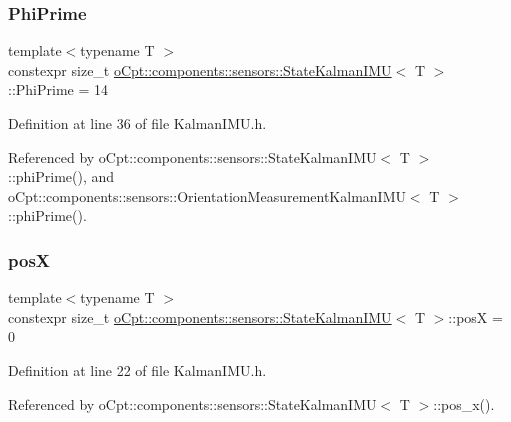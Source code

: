 \subsubsection{\texorpdfstring{Phi\+Prime}{PhiPrime}}
{\footnotesize\ttfamily template$<$typename T $>$ \\
constexpr size\+\_\+t \hyperlink{classo_cpt_1_1components_1_1sensors_1_1_state_kalman_i_m_u}{o\+Cpt\+::components\+::sensors\+::\+State\+Kalman\+I\+MU}$<$ T $>$\+::Phi\+Prime = 14\hspace{0.3cm}{\ttfamily [static]}}



Definition at line 36 of file Kalman\+I\+M\+U.\+h.



Referenced by o\+Cpt\+::components\+::sensors\+::\+State\+Kalman\+I\+M\+U$<$ T $>$\+::phi\+Prime(), and o\+Cpt\+::components\+::sensors\+::\+Orientation\+Measurement\+Kalman\+I\+M\+U$<$ T $>$\+::phi\+Prime().

\hypertarget{classo_cpt_1_1components_1_1sensors_1_1_state_kalman_i_m_u_a3992946bc78f848a4e76bfa8e9bdbaf6}{}\label{classo_cpt_1_1components_1_1sensors_1_1_state_kalman_i_m_u_a3992946bc78f848a4e76bfa8e9bdbaf6} 
\subsubsection{\texorpdfstring{posX}{posX}}
{\footnotesize\ttfamily template$<$typename T $>$ \\
constexpr size\+\_\+t \hyperlink{classo_cpt_1_1components_1_1sensors_1_1_state_kalman_i_m_u}{o\+Cpt\+::components\+::sensors\+::\+State\+Kalman\+I\+MU}$<$ T $>$\+::posX = 0\hspace{0.3cm}{\ttfamily [static]}}



Definition at line 22 of file Kalman\+I\+M\+U.\+h.



Referenced by o\+Cpt\+::components\+::sensors\+::\+State\+Kalman\+I\+M\+U$<$ T $>$\+::pos\+\_\+x().

\hypertarget{classo_cpt_1_1components_1_1sensors_1_1_state_kalman_i_m_u_a418da0a368af2e931c09211aac2451c2}{}\label{classo_cpt_1_1components_1_1sensors_1_1_state_kalman_i_m_u_a418da0a368af2e931c09211aac2451c2} 
